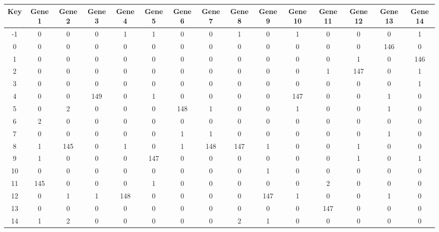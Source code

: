 \begin{tabular}{|c|c|c|c|c|c|c|c|c|c|c|c|c|c|c|}
\hline
Key & Gene 1 & Gene 2 & Gene 3 & Gene 4 & Gene 5 & Gene 6 & Gene 7 & Gene 8 & Gene 9 & Gene 10 & Gene 11 & Gene 12 & Gene 13 & Gene 14 \\
\hline
-1 & 0 & 0 & 0 & 1 & 1 & 0 & 0 & 1 & 0 & 1 & 0 & 0 & 0 & 1 \\
0 & 0 & 0 & 0 & 0 & 0 & 0 & 0 & 0 & 0 & 0 & 0 & 0 & 146 & 0 \\
1 & 0 & 0 & 0 & 0 & 0 & 0 & 0 & 0 & 0 & 0 & 0 & 1 & 0 & 146 \\
2 & 0 & 0 & 0 & 0 & 0 & 0 & 0 & 0 & 0 & 0 & 1 & 147 & 0 & 1 \\
3 & 0 & 0 & 0 & 0 & 0 & 0 & 0 & 0 & 0 & 0 & 0 & 0 & 0 & 1 \\
4 & 0 & 0 & 149 & 0 & 1 & 0 & 0 & 0 & 0 & 147 & 0 & 0 & 1 & 0 \\
5 & 0 & 2 & 0 & 0 & 0 & 148 & 1 & 0 & 0 & 1 & 0 & 0 & 1 & 0 \\
6 & 2 & 0 & 0 & 0 & 0 & 0 & 0 & 0 & 0 & 0 & 0 & 0 & 0 & 0 \\
7 & 0 & 0 & 0 & 0 & 0 & 1 & 1 & 0 & 0 & 0 & 0 & 0 & 1 & 0 \\
8 & 1 & 145 & 0 & 1 & 0 & 1 & 148 & 147 & 1 & 0 & 0 & 1 & 0 & 0 \\
9 & 1 & 0 & 0 & 0 & 147 & 0 & 0 & 0 & 0 & 0 & 0 & 1 & 0 & 1 \\
10 & 0 & 0 & 0 & 0 & 0 & 0 & 0 & 0 & 1 & 0 & 0 & 0 & 0 & 0 \\
11 & 145 & 0 & 0 & 0 & 1 & 0 & 0 & 0 & 0 & 0 & 2 & 0 & 0 & 0 \\
12 & 0 & 1 & 1 & 148 & 0 & 0 & 0 & 0 & 147 & 1 & 0 & 0 & 1 & 0 \\
13 & 0 & 0 & 0 & 0 & 0 & 0 & 0 & 0 & 0 & 0 & 147 & 0 & 0 & 0 \\
14 & 1 & 2 & 0 & 0 & 0 & 0 & 0 & 2 & 1 & 0 & 0 & 0 & 0 & 0 \\
\hline
\end{tabular}